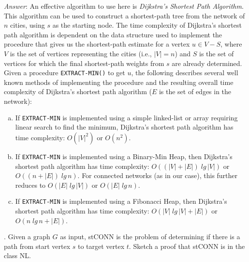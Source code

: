 \documentclass{scrartcl}
\begin{document}
    \noindent
    \textit{Answer}: An effective algorithm to use here is \emph{Dijkstra's Shortest Path
    Algorithm}. This algorithm can be used to construct a shortest-path tree from the network of $n$
    cities, using $s$ as the starting node. The time complexity of Dijkstra's shortest path
    algorithm is dependent on the data structure used to implement the procedure that gives us the
    shortest-path estimate for a vertex $u \in V - S$, where $V$ is the set of vertices representing
    the cities (i.e., $|V| = n$) and $S$ is the set of vertices for which the final shortest-path
    weights from $s$ are already determined. Given a procedure \verb|EXTRACT-MIN()| to get $u$, the
    following describes several well known methods of implementing the procedure and the resulting
    overall time complexity of Dijkstra's shortest path algorithm ($E$ is the set of edges in the
    network):
    \begin{enumerate}[(a)]
        \item If \verb|EXTRACT-MIN| is implemented using a simple linked-list or array requiring
            linear search to find the minimum, Dijkstra's shortest path algorithm has time
            complexity: $O(|V|^2)$ or $O(n^2)$.\\
        \item If \verb|EXTRACT-MIN| is implemented using a Binary-Min Heap, then Dijkstra's shortest
            path algorithm has time complexity: $O((|V| + |E|)\;lg\,|V|)$ or $O((n + |E|)\;lg\,n)$.
            For connected networks (as in our case), this further reduces to $O(|E|\;lg\,|V|)$ or
            $O(|E|\;lg\,n)$.\\
        \item If \verb|EXTRACT-MIN| is implemented using a Fibonacci Heap, then Dijkstra's shortest
            path algorithm has time complexity: $O(|V|\;lg\,|V| + |E|)$ or $O(n\;lg\,n + |E|)$.
    \end{enumerate}

    \bigskip
    . Given a graph $G$ as input, \textsf{stCONN} is the problem of determining if there is a path
    from start vertex $s$ to target vertex $t$. Sketch a proof that \textsf{stCONN} is in the class
    \textsf{NL}.\\
\end{document}

